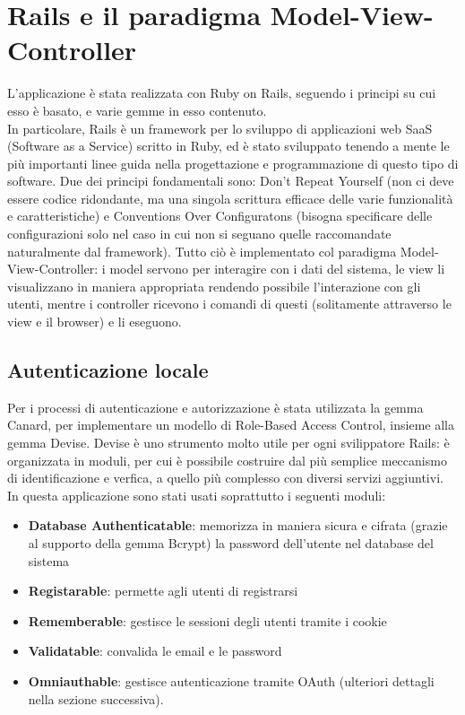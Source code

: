 \documentclass[Lau, binding=0.6cm, oneside]{sapthesis}
\begin{document}
\section{Rails e il paradigma Model-View-Controller} \label{mvc}

L’applicazione è stata realizzata con Ruby on Rails, seguendo i principi su cui esso è basato, e varie gemme in esso contenuto.\\
In particolare, Rails è un framework per lo sviluppo di applicazioni web SaaS (Software as a Service) scritto in Ruby, ed è stato sviluppato tenendo a mente le più importanti linee guida nella progettazione e programmazione di questo tipo di software. Due dei principi fondamentali sono: Don’t Repeat Yourself (non ci deve essere codice ridondante, ma una singola scrittura efficace delle varie funzionalità e caratteristiche) e Conventions Over Configuratons (bisogna specificare delle configurazioni solo nel caso in cui non si seguano quelle raccomandate naturalmente dal framework).
Tutto ciò è implementato col paradigma Model-View-Controller: i model servono per interagire con i dati del sistema, le view li visualizzano in maniera appropriata rendendo possibile l’interazione con gli utenti, mentre i controller ricevono i comandi di questi (solitamente attraverso le view e il browser) e li eseguono.

\subsection{Autenticazione locale}

Per i processi di autenticazione e autorizzazione è stata utilizzata la gemma Canard, per implementare un modello di Role-Based Access Control, insieme alla gemma Devise.
Devise è uno strumento molto utile per ogni svilippatore Rails: è organizzata in moduli, per cui è possibile costruire dal più semplice meccanismo di identificazione e verfica, a quello più complesso con diversi servizi aggiuntivi. In questa applicazione sono stati usati soprattutto i seguenti moduli:

\begin{itemize}
	\item \textbf{Database Authenticatable}: memorizza in maniera sicura e cifrata (grazie al supporto della gemma Bcrypt) la password dell’utente nel database del sistema
	\item \textbf{Registarable}: permette agli utenti di registrarsi
	\item \textbf{Rememberable}: gestisce le sessioni degli utenti tramite i cookie
	\item \textbf{Validatable}: convalida le email e le password
	\item \textbf{Omniauthable}: gestisce autenticazione tramite OAuth (ulteriori dettagli nella sezione successiva).
\end{itemize}
\end{document}
